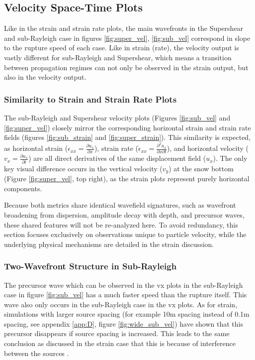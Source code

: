 \subsection{Velocity Space-Time Plots}
\label{sec:vel_disc}
Like in the strain and strain rate plots, the main wavefronts in the Supershear and sub-Rayleigh case in figures \ref{fig:super_vel}, \ref{fig:sub_vel} correspond in slope to the rupture speed of each case. Like in strain (rate), the velocity output is vastly different for sub-Rayleigh and Supershear, which means a transition between propagation regimes can not only be observed in the strain output, but also in the velocity output. \par

\subsubsection{Similarity to Strain and Strain Rate Plots}
The sub-Rayleigh and Supershear velocity plots (Figures \ref{fig:sub_vel} and \ref{fig:super_vel}) closely mirror the corresponding horizontal strain and strain rate fields (figures \ref{fig:sub_strain} and \ref{fig:super_strain}). This similarity is expected, as horizontal strain ($\epsilon_{xx} = \frac{\partial u_x}{\partial x}$), strain rate ($\dot{\epsilon}_{xx} = \frac{\partial^2 u_x}{\partial x \partial t}$), and horizontal velocity ($v_x = \frac{\partial u_x}{\partial t}$) are all direct derivatives of the same displacement field ($u_x$). The only key visual difference occurs in the vertical velocity ($v_y$) at the snow bottom (Figure \ref{fig:super_vel}, top right), as the strain plots represent purely horizontal components. 

Because both metrics share identical wavefield signatures, such as wavefront broadening from dispersion, amplitude decay with depth, and precursor waves, these shared features will not be re-analyzed here. To avoid redundancy, this section focuses exclusively on observations unique to particle velocity, while the underlying physical mechanisms are detailed in the strain discussion. \par

\subsubsection{Two-Wavefront Structure in Sub-Rayleigh}
\label{sec:disc_sub_two_waves}

The precursor wave which can be observed in the vx plots in the sub-Rayleigh case in figure \ref{fig:sub_vel} has a much faster speed than the rupture itself. This wave also only occurs in the sub-Rayleigh case in the vx plots. As for strain, simulations with larger source spacing (for example 10m spacing instead of 0.1m spacing, see appendix \ref{app:D}, figure \ref{fig:wide_sub_vel}) have shown that this precursor disappears if source spacing is increased. This leads to the same conclusion as discussed in the strain case that this is because of interference between the sources \parencite{madariagaDynamicsExpandingCircular1976}. \par

